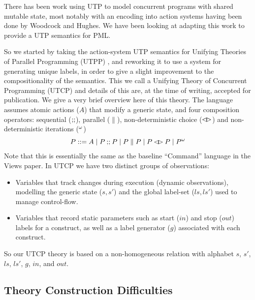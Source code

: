 There has been work using UTP
to model concurrent programs with shared mutable state,
most notably
with an encoding into action systems having been done by
Woodcock and Hughes\cite{DBLP:conf/icfem/WoodcockH02}.
We have been looking at adapting this work to provide a UTP semantics
for PML.

So we started by taking the action-system UTP semantics for Unifying Theories
of Parallel Programming (UTPP) \cite{DBLP:conf/icfem/WoodcockH02},
and reworking it to use a system for generating unique labels,
in order to give a slight improvement to the compositionality
of the semantics. This we call a Unifying Theory of Concurrent Programming
(UTCP) and details of this are,
at the time of writing,
accepted for publication\cite{conf/tase/BMN16}.
We give a very brief overview here of this theory.
The language assumes atomic actions ($A$) that modify a generic state,
and four composition operators: sequential ($\mathrel{\mathbf{;\!;}}$), parallel ($\parallel$),
non-deterministic choice ($\mathbin{\lhd\!\rhd}$) and non-deterministic iterations (${}^{\omega}$)
\[
   P ::= A \mid P \mathbin{\mathbf{;\!;}} P \mid P \parallel P \mid P \mathbin{\lhd\!\rhd} P \mid {P}^{\omega}
\]
Note that this is essentially the same as the baseline ``Command'' language
in the Views paper\cite{conf/popl/Dinsdale-YoungBGPY13}.
In UTCP we have two distinct groups of observations:
\begin{itemize}
  \item
    Variables that track changes during execution
    (dynamic observations),
    modelling the generic state ($s,s'$)
    and the global label-set ($ls,ls'$) used to manage control-flow.
  \item
    Variables that record static parameters such as start ($in$)
    and stop ($out$) labels for a construct,
    as well as a label generator ($g$) associated with each construct.
\end{itemize}
So our UTCP theory is based on a non-homogeneous relation
with alphabet $s$, $s'$, $ls$, $ls'$, $g$, $in$, and $out$.


\subsection{Theory Construction Difficulties}\label{ssec:difficulties}

